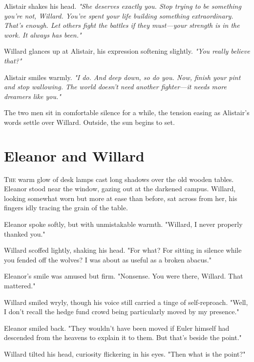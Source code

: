 Alistair shakes his head.  
\textit{"She deserves exactly you. Stop trying to be something you’re not, Willard. You’ve spent your life building something extraordinary. That’s enough. Let others fight the battles if they must—your strength is in the work. It always has been."}
\smallskip

Willard glances up at Alistair, his expression softening slightly.  
\textit{"You really believe that?"}
\smallskip

Alistair smiles warmly.  
\textit{"I do. And deep down, so do you. Now, finish your pint and stop wallowing. The world doesn’t need another fighter—it needs more dreamers like you."}

\smallskip

The two men sit in comfortable silence for a while, the tension easing as Alistair’s words settle over Willard. Outside, the sun begins to set.

\newpage

\section*{Eleanor and Willard}

\smallskip

\lettrine{T}{he} warm glow of desk lamps cast long shadows over the old wooden tables. Eleanor stood near the window, gazing out at the darkened campus. Willard, looking somewhat worn but more at ease than before, sat across from her, his fingers idly tracing the grain of the table.

\smallskip

Eleanor spoke softly, but with unmistakable warmth.  
"Willard, I never properly thanked you."
\smallskip

Willard scoffed lightly, shaking his head.  
"For what? For sitting in silence while you fended off the wolves? I was about as useful as a broken abacus."
\smallskip

Eleanor’s smile was amused but firm.  
"Nonsense. You were there, Willard. That mattered."
\smallskip

Willard smiled wryly, though his voice still carried a tinge of self-reproach.  
"Well, I don’t recall the hedge fund crowd being particularly moved by my presence."
\smallskip

Eleanor smiled back.  
"They wouldn’t have been moved if Euler himself had descended from the heavens to explain it to them. But that’s beside the point."
\smallskip

Willard tilted his head, curiosity flickering in his eyes.  
"Then what is the point?"
\smallskip

